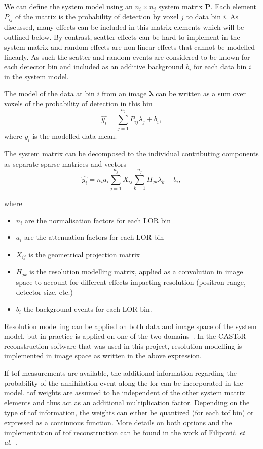 We can define the system model using an $n_i \times n_j$ system matrix $\bm{P}$. Each element $P_{ij}$ of the matrix is the probability of detection by voxel $j$ to data bin $i$. 
As discussed, many effects can be included in this matrix elements which will be outlined below. By contrast, scatter effects can be hard to implement in the system matrix and random effects are non-linear effects that cannot be modelled linearly. As such the scatter and random events are considered to be known for each detector bin and included as an additive background $b_i$ for each data bin $i$ in the system model.

The model of the data at bin $i$ from an image $\bm{\lambda}$ can be written as a sum over voxels of the probability of detection in this bin 
\begin{equation}
   \hat{y_i} = \sum_{j=1}^{n_j} P_{ij} \lambda_j + b_i ,
   \label{eqn:system_model}
\end{equation}
where $\hat{y_i}$ is the modelled data mean.

The system matrix can be decomposed to the individual contributing components as separate sparse matrices and vectors
\begin{equation}
   \hat{y_i} = n_i a_i \sum_{j=1}^{n_j} X_{ij} \sum_{k=1}^{n_j} H_{jk} \lambda_{k} + b_i ,
\end{equation}

where
\begin{itemize}
    \item $n_i$ are the normalisation factors for each LOR bin
    \item $a_i$ are the attenuation factors for each LOR bin
    \item $X_{ij}$ is the geometrical projection matrix
    \item $H_{jk}$ is the resolution modelling matrix, applied as a convolution in image space to account for different effects impacting resolution (positron range, detector size, etc.)
    \item $b_i$ the background events for each LOR bin.
\end{itemize}
%
Resolution modelling can be applied on both data and image space of the system model, but in practice is applied on one of the two domains~\cite{Stute2013}. In the CASToR reconstruction software that was used in this project, resolution modelling is implemented in image space as written in the above expression.

If \gls{tof} measurements are available, the additional information regarding the probability of the annihilation event along the \gls{lor} can be incorporated in the model. \Gls{tof} weights are assumed to be independent of the other system matrix elements and thus act as an additional multiplication factor. Depending on the type of \gls{tof} information, the weights can either be quantized (for each \gls{tof} bin) or expressed as a continuous function. More details on both options and the implementation of \gls{tof} reconstruction can be found in the work of Filipović~\textit{et al.}~\cite{Filipovic_2019}. 
%
